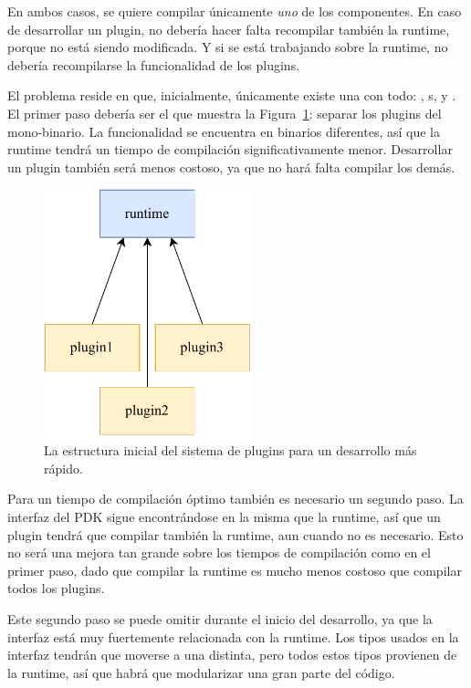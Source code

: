 En ambos casos, se quiere compilar únicamente \emph{uno} de los componentes. En
caso de desarrollar un plugin, no debería hacer falta recompilar también la
runtime, porque no está siendo modificada. Y si se está trabajando sobre la
runtime, no debería recompilarse la funcionalidad de los plugins.

El problema reside en que, inicialmente, únicamente existe una \crate con todo:
, s, y . El primer paso debería ser el
que muestra la Figura~\ref{fig:separation_temporary}: separar los plugins del
mono-binario. La funcionalidad se encuentra en binarios diferentes, así que la
runtime tendrá un tiempo de compilación significativamente menor. Desarrollar un
plugin también será menos costoso, ya que no hará falta compilar los demás.

\begin{figure}
    \centering
    \includegraphics[width=6cm]{./Imagenes/separation-temporary.pdf}
    \caption{La estructura inicial del sistema de plugins para un desarrollo más
    rápido.}%
    \label{fig:separation_temporary}
\end{figure}

Para un tiempo de compilación óptimo también es necesario un segundo paso. La
interfaz del PDK sigue encontrándose en la misma \crate que la runtime, así que
un plugin tendrá que compilar también la runtime, aun cuando no es necesario.
Esto no será una mejora tan grande sobre los tiempos de compilación como en el
primer paso, dado que compilar la runtime es mucho menos costoso que compilar
todos los plugins.

Este segundo paso se puede omitir durante el inicio del desarrollo, ya que la
interfaz está muy fuertemente relacionada con la runtime. Los tipos usados en la
interfaz tendrán que moverse a una \crate distinta, pero todos estos tipos
provienen de la runtime, así que habrá que modularizar una gran parte del
código.

